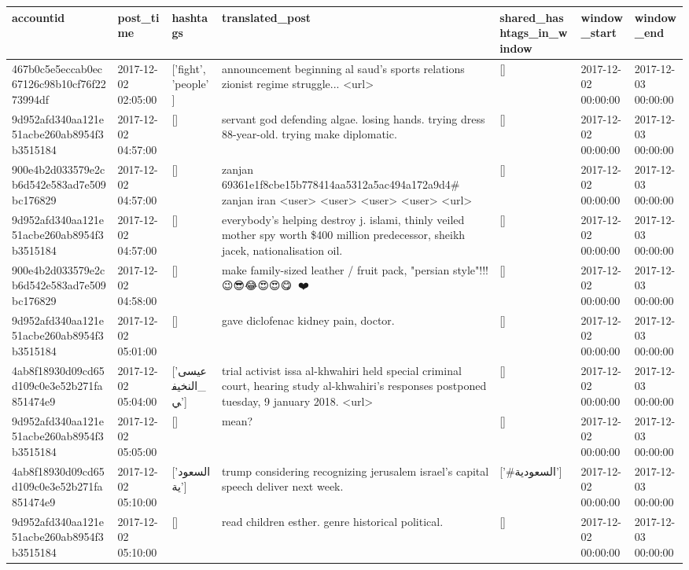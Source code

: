 \begin{tabular}{lllllll}
\toprule
accountid & post\_time & hashtags & translated\_post & shared\_hashtags\_in\_window & window\_start & window\_end \\
\midrule
467b0c5e5eccab0ec67126c98b10cf76f2273994df & 2017-12-02 02:05:00 & ['fight', 'people'] & announcement beginning al saud's sports relations zionist regime struggle... <url> & [] & 2017-12-02 00:00:00 & 2017-12-03 00:00:00 \\
9d952afd340aa121e51acbe260ab8954f3b3515184 & 2017-12-02 04:57:00 & [] & servant god defending algae. losing hands. trying dress 88-year-old. trying make diplomatic. & [] & 2017-12-02 00:00:00 & 2017-12-03 00:00:00 \\
900e4b2d033579e2cb6d542e583ad7e509bc176829 & 2017-12-02 04:57:00 & [] & zanjan 69361e1f8cbe15b778414aa5312a5ac494a172a9d4\# zanjan iran <user> <user> <user> <user> <url> & [] & 2017-12-02 00:00:00 & 2017-12-03 00:00:00 \\
9d952afd340aa121e51acbe260ab8954f3b3515184 & 2017-12-02 04:57:00 & [] & everybody's helping destroy j. islami, thinly veiled mother spy worth \$400 million predecessor, sheikh jacek, nationalisation oil. & [] & 2017-12-02 00:00:00 & 2017-12-03 00:00:00 \\
900e4b2d033579e2cb6d542e583ad7e509bc176829 & 2017-12-02 04:58:00 & [] & make family-sized leather / fruit pack, "persian style"!!! 😉😎😂😍😍😋🌹🙏❤️ & [] & 2017-12-02 00:00:00 & 2017-12-03 00:00:00 \\
9d952afd340aa121e51acbe260ab8954f3b3515184 & 2017-12-02 05:01:00 & [] & gave diclofenac kidney pain, doctor. & [] & 2017-12-02 00:00:00 & 2017-12-03 00:00:00 \\
4ab8f18930d09cd65d109c0e3e52b271fa851474e9 & 2017-12-02 05:04:00 & ['عيسى_النخيفي'] & trial activist issa al-khwahiri held special criminal court, hearing study al-khwahiri's responses postponed tuesday, 9 january 2018. <url> & [] & 2017-12-02 00:00:00 & 2017-12-03 00:00:00 \\
9d952afd340aa121e51acbe260ab8954f3b3515184 & 2017-12-02 05:05:00 & [] & mean? & [] & 2017-12-02 00:00:00 & 2017-12-03 00:00:00 \\
4ab8f18930d09cd65d109c0e3e52b271fa851474e9 & 2017-12-02 05:10:00 & ['السعودية'] & trump considering recognizing jerusalem israel's capital speech deliver next week. & ['#السعودية'] & 2017-12-02 00:00:00 & 2017-12-03 00:00:00 \\
9d952afd340aa121e51acbe260ab8954f3b3515184 & 2017-12-02 05:10:00 & [] & read children esther. genre historical political. & [] & 2017-12-02 00:00:00 & 2017-12-03 00:00:00 \\

\end{tabular}

